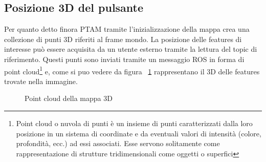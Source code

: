 \subsection{Posizione 3D del pulsante}
Per quanto detto finora PTAM tramite l'inizializzazione della mappa crea una collezione di punti 3D riferiti al frame mondo. La posizione delle features di interesse può essere acquisita da un utente esterno tramite la lettura del topic di riferimento. Questi punti sono inviati tramite un messaggio ROS in forma di point cloud\footnote{ Point cloud o nuvola di punti è un insieme di punti caratterizzati dalla loro posizione in un sistema di coordinate e da eventuali valori di intensità (colore, profondità, ecc.) ad essi associati. Esse servono solitamente come rappresentazione di strutture tridimensionali come oggetti o superfici } e, come si puo vedere da figura ~\ref{fig:point_cloud} rappresentano il 3D delle features trovate nella immagine.  
\begin{figure}[H]
   \centering
   \caption{Point cloud della mappa 3D}
   \label{fig:point_cloud} 
\end{figure}


